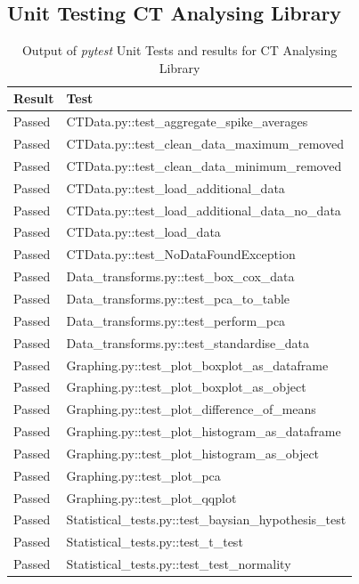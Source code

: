 \documentclass[11pt]{report}
\begin{document}
\subsection{Unit Testing CT Analysing Library}
\label{sec-2-9-2}
\begin{table}[htb]
\caption{\label{tab:unittest}Output of \emph{pytest} Unit Tests and results for CT Analysing Library}
\centering
\begin{tabularx}{\textwidth}{|l|X|}
\hline
\textbf{Result} & \textbf{Test}\\
\hline
\color{ForestGreen}Passed & CTData.py::test\_aggregate\_spike\_averages\\
\hline
\color{ForestGreen}Passed & CTData.py::test\_clean\_data\_maximum\_removed\\
\hline
\color{ForestGreen}Passed & CTData.py::test\_clean\_data\_minimum\_removed\\
\hline
\color{ForestGreen}Passed & CTData.py::test\_load\_additional\_data\\
\hline
\color{ForestGreen}Passed & CTData.py::test\_load\_additional\_data\_no\_data\\
\hline
\color{ForestGreen}Passed & CTData.py::test\_load\_data\\
\hline
\color{ForestGreen}Passed & CTData.py::test\_NoDataFoundException\\
\hline
\color{ForestGreen}Passed & Data\_transforms.py::test\_box\_cox\_data\\
\hline
\color{ForestGreen}Passed & Data\_transforms.py::test\_pca\_to\_table\\
\hline
\color{ForestGreen}Passed & Data\_transforms.py::test\_perform\_pca\\
\hline
\color{ForestGreen}Passed & Data\_transforms.py::test\_standardise\_data\\
\hline
\color{ForestGreen}Passed & Graphing.py::test\_plot\_boxplot\_as\_dataframe\\
\hline
\color{ForestGreen}Passed & Graphing.py::test\_plot\_boxplot\_as\_object\\
\hline
\color{ForestGreen}Passed & Graphing.py::test\_plot\_difference\_of\_means\\
\hline
\color{ForestGreen}Passed & Graphing.py::test\_plot\_histogram\_as\_dataframe\\
\hline
\color{ForestGreen}Passed & Graphing.py::test\_plot\_histogram\_as\_object\\
\hline
\color{ForestGreen}Passed & Graphing.py::test\_plot\_pca\\
\hline
\color{ForestGreen}Passed & Graphing.py::test\_plot\_qqplot\\
\hline
\color{ForestGreen}Passed & Statistical\_tests.py::test\_baysian\_hypothesis\_test\\
\hline
\color{ForestGreen}Passed & Statistical\_tests.py::test\_t\_test\\
\hline
\color{ForestGreen}Passed & Statistical\_tests.py::test\_test\_normality\\
\hline
\end{tabularx}
\end{table}
\end{document}
